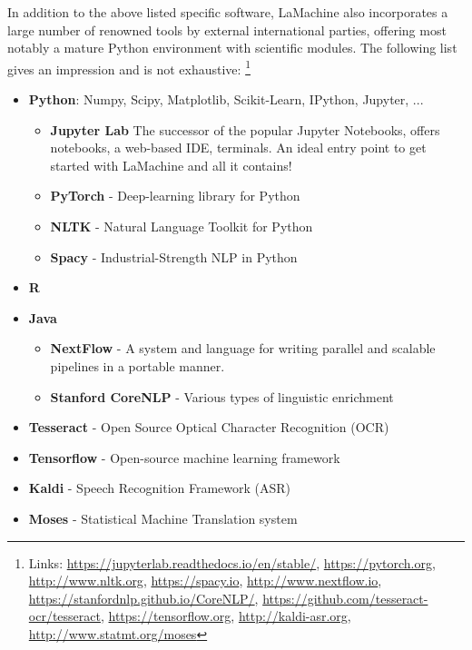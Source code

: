 \documentclass[a4paper,11pt]{article}
\begin{document}
In addition to the above listed specific software, LaMachine also incorporates a large number of renowned tools by external international parties, offering
most notably a mature Python environment with scientific modules. The following list gives an impression and is not
exhaustive: \footnote{Links: \url{https://jupyterlab.readthedocs.io/en/stable/}, \url{https://pytorch.org}, \url{http://www.nltk.org},
    \url{https://spacy.io},  \url{http://www.nextflow.io}, \url{https://stanfordnlp.github.io/CoreNLP/},  \url{https://github.com/tesseract-ocr/tesseract}, \url{https://tensorflow.org},
\url{http://kaldi-asr.org}, \url{http://www.statmt.org/moses}}

\begin{itemize}
    \item \textbf{Python}: Numpy, Scipy, Matplotlib, Scikit-Learn, IPython, Jupyter, ...
    \begin{itemize}
        \item \textbf{Jupyter Lab} The successor of the popular Jupyter Notebooks, offers notebooks, a web-based IDE, terminals. An ideal entry point to get started with LaMachine and all it contains!
        \item \textbf{PyTorch} - Deep-learning library for Python
        \item \textbf{NLTK} - Natural Language Toolkit for Python
        \item \textbf{Spacy} - Industrial-Strength NLP in Python
    \end{itemize}
    \item \textbf{R}
    \item \textbf{Java}
    \begin{itemize}
        \item \textbf{NextFlow} - A system and language for writing parallel and scalable pipelines in a portable manner.
        \item \textbf{Stanford CoreNLP} - Various types of linguistic enrichment
    \end{itemize}
    \item \textbf{Tesseract} - Open Source Optical Character Recognition (OCR)
    \item \textbf{Tensorflow} - Open-source machine learning framework
    \item \textbf{Kaldi} - Speech Recognition Framework (ASR)
    \item \textbf{Moses} - Statistical Machine Translation system
\end{itemize}
\end{document}
